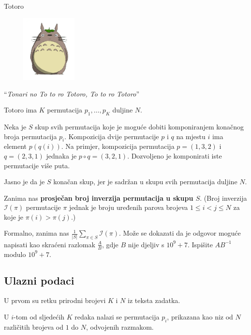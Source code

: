 \begin{statement}[
  problempoints=100,
  timelimit=1 sekunda,
  memorylimit=512 MiB,
]{Totoro}

\setlength\intextsep{-0.1cm}
\begin{figure}
\centering
\includegraphics[width=0.25\textwidth]{img/totoro.png}
\end{figure}

``\textit{Tonari no To to ro Totoro, To to ro Totoro}'' 

Totoro ima $K$ permutacija $p_1, \ldots, p_K$ duljine $N$.

Neka je $S$ skup svih permutacija koje je moguće
dobiti komponiranjem konačnog broja permutacija $p_i$. 
Kompozicija dvije permutacije $p$ i $q$ 
na mjestu $i$ ima element $p(q(i))$. Na primjer, 
kompozicija permutacija $p = (1, 3, 2)$
i $q = (2, 3, 1)$ jednaka je $p \circ q = (3, 2, 1)$. 
Dozvoljeno je komponirati iste permutacije više puta.

Jasno je da je $S$ konačan skup, jer je sadržan u skupu svih
permutacija duljine $N$.

Zanima nas \textbf{prosječan broj inverzija permutacija u skupu $S$}.
(Broj inverzija $\mathcal{I}(\pi)$ permutacije $\pi$ 
jednak je broju uređenih parova
brojeva $1 \le i < j \le N$ za koje je $\pi(i) > \pi(j)$.)

Formalno, zanima nas $\frac{1}{|S|} \sum_{\pi \in S} \mathcal{I} (\pi)$.
Može se dokazati da je odgovor moguće napisati
kao skraćeni razlomak $\frac{A}{B}$, gdje $B$ nije djeljiv s $10^9 + 7$. 
Ispišite $AB^{-1}$ modulo $10^9 + 7$.

\subsection*{Ulazni podaci}
U prvom su retku prirodni brojevi $K$ i $N$ iz teksta zadatka.

U $i$-tom od sljedećih $K$ redaka nalazi se permutacija $p_i$, 
prikazana kao niz od $N$ različitih brojeva od $1$ do $N$, odvojenih razmakom.


\end{statement}
